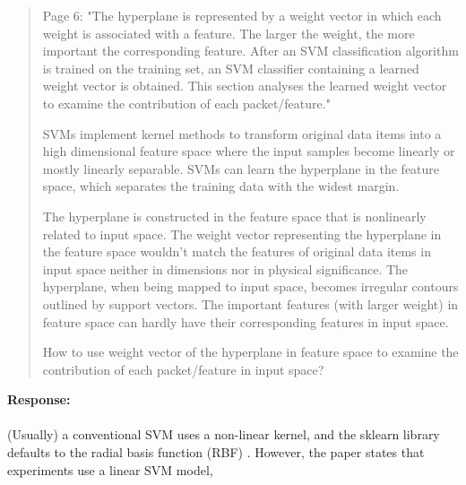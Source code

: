 \documentclass[runningheads]{llncs}
\begin{document}
\begin{quote}
  Page 6: "The hyperplane is represented by a weight vector in which each weight is associated with a feature. The larger the weight, the more important the corresponding feature. After an SVM classification algorithm is trained on the training set, an SVM classifier containing a learned weight vector is obtained. This section analyses the learned weight vector to examine the contribution of each packet/feature."

  SVMs implement kernel methods to transform original data items into a high dimensional feature space where the input samples become linearly or mostly linearly separable. SVMs can learn the hyperplane in the feature space, which separates the training data with the widest margin.

  The hyperplane is constructed in the feature space that is nonlinearly related to input space. The weight vector representing the hyperplane in the feature space wouldn't match the features of original data items in input space neither in dimensions nor in physical significance. The hyperplane, when being mapped to input space, becomes irregular contours outlined by support vectors. The important features (with larger weight) in feature space can hardly have their corresponding features in input space.

  How to use weight vector of the hyperplane in feature space to examine the contribution of each packet/feature in input space?
\end{quote}

\noindent\textbf{Response:}
\\\\
(Usually) a conventional SVM uses a non-linear kernel, and the sklearn library defaults to the radial basis function (RBF) \cite{sklearn2021feature}. 
However, the paper states that experiments use a linear SVM model,
\end{document}
